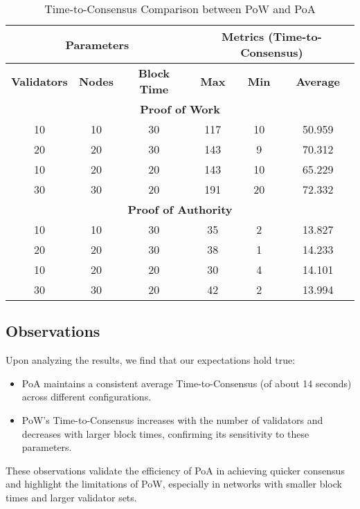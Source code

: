 \begin{table}[h]
\centering
\caption{Time-to-Consensus Comparison between PoW and PoA}
\label{table:time-to-consensus}
\begin{tabular}{|c|c|c||c|c|c|}
\hline
\multicolumn{3}{|c||}{\textbf{Parameters}} & \multicolumn{3}{c|}{\textbf{Metrics (Time-to-Consensus)}} \\
\hline
\textbf{Validators} & \textbf{Nodes} & \textbf{Block Time} & \textbf{Max} & \textbf{Min} & \textbf{Average} \\
\hline
\multicolumn{6}{|c|}{\textbf{Proof of Work}} \\
\hline
\rowcolor{Gray}
10 & 10 & 30 & 117 & 10 & 50.959 \\
\rowcolor{LightBlue}
20 & 20 & 30 & 143 & 9 & 70.312 \\
\rowcolor{LightYellow}
10 & 20 & 20 & 143 & 10 & 65.229 \\
\rowcolor{LightRed}
30 & 30 & 20 & 191 & 20 & 72.332 \\
\hline
\multicolumn{6}{|c|}{\textbf{Proof of Authority}} \\
\hline
\rowcolor{Gray}
10 & 10 & 30 & 35 & 2 & 13.827 \\
\rowcolor{LightBlue}
20 & 20 & 30 & 38 & 1 & 14.233 \\
\rowcolor{LightYellow}
10 & 20 & 20 & 30 & 4 & 14.101 \\
\rowcolor{LightRed}
30 & 30 & 20 & 42 & 2 & 13.994 \\
\hline
\end{tabular}
\end{table}


\subsection*{Observations}

Upon analyzing the results, we find that our expectations hold true:

\begin{itemize}
    \item PoA maintains a consistent average Time-to-Consensus (of about 14 seconds) across different configurations.
    \item PoW's Time-to-Consensus increases with the number of validators and decreases with larger block times, confirming its sensitivity to these parameters.
\end{itemize}

These observations validate the efficiency of PoA in achieving quicker consensus and highlight the limitations of PoW, especially in networks with smaller block times and larger validator sets.


